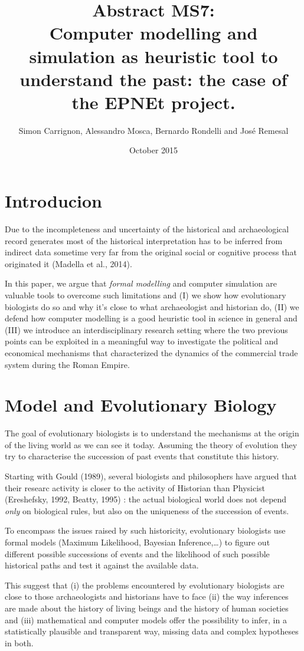 \documentclass[a4paper]{article}
\title{Abstract MS7:\\ Computer modelling and simulation as heuristic tool to understand the past: the case of the EPNEt project.}
\author{Simon Carrignon, Alessandro Mosca, Bernardo Rondelli and Jos\'{e} Remesal}
\date{October 2015}
\begin{document}
 


\section{Introducion}

Due to the incompleteness and uncertainty of the historical and archaeological record generates most of the historical interpretation has to be inferred from indirect data sometime very far from the original social or cognitive process that originated it (Madella et al., 2014).

In this paper, we argue that \emph{formal modelling} and computer simulation are valuable tools to overcome such limitations and (I) we show how evolutionary biologists do so and why it's close to what archaeologist and historian do, (II) we defend how computer modelling is a good heuristic tool in science in general and (III) we introduce an interdisciplinary research setting where the two previous points can be exploited in a meaningful way to investigate the political and economical mechanisms that characterized the dynamics of the commercial trade system during the Roman Empire.

\section{Model and Evolutionary Biology }
The goal of evolutionary biologists is to understand the mechanisms at the origin of the living world as we can see it today. Assuming the theory of evolution they try to characterise the succession of past events that constitute this history. 

Starting with Gould (1989), several biologists and philosophers have argued that their researc activity is closer to the activity of Historian than Physicist (Ereshefsky, 1992, Beatty, 1995) : the actual biological world does not depend \emph{only} on biological rules, but also on the uniqueness of the succession of events.

To encompass the issues raised by such historicity, evolutionary biologists use formal models (Maximum Likelihood, Bayesian Inference,\ldots) to figure out different possible successions of events and the likelihood of such possible historical paths and test it against the available data.

This suggest that (i) the problems encountered by evolutionary biologists are close to those archaeologists and historians have to face (ii) the way inferences are made about the history of living beings and the history of human societies and (iii) mathematical and computer models offer the possibility to infer, in a statistically plausible and transparent way, missing data and complex hypotheses in both.
\end{document}
